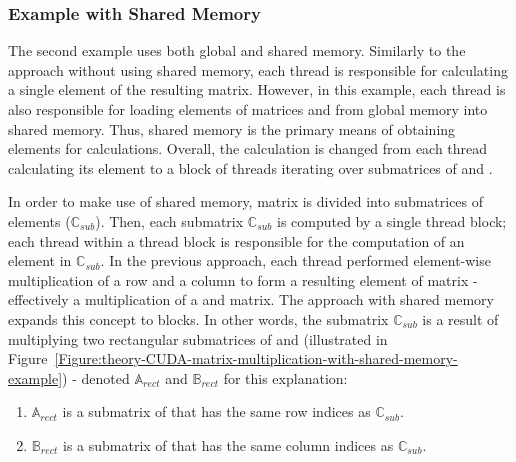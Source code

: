 \subsubsection{Example with Shared Memory}\label{Subsubsection:theory-CUDA-matrix-multiplication-example-with-shared-memory}
The second example uses both global and shared memory. Similarly to the approach without using shared memory, each thread is responsible for calculating a single element of the resulting  matrix. However, in this example, each thread is also responsible for loading elements of matrices  and  from global memory into shared memory. Thus, shared memory is the primary means of obtaining elements for calculations. Overall, the calculation is changed from each thread calculating its element to a block of threads iterating over submatrices of  and .
\par In order to make use of shared memory, matrix  is divided into submatrices of  elements ($ \mathbb{C}_{sub} $). Then, each submatrix $ \mathbb{C}_{sub} $ is computed by a single thread block; each thread within a thread block is responsible for the computation of an element in $ \mathbb{C}_{sub} $. In the previous approach, each thread performed element-wise multiplication of a row and a column to form a resulting element of matrix  - effectively a multiplication of a  and  matrix. The approach with shared memory expands this concept to blocks. In other words, the submatrix $ \mathbb{C}_{sub} $ is a result of multiplying two rectangular submatrices of  and  (illustrated in Figure~\ref{Figure:theory-CUDA-matrix-multiplication-with-shared-memory-example}) - denoted $ \mathbb{A}_{rect} $ and $ \mathbb{B}_{rect} $ for this explanation:

\begin{enumerate}
	\item $ \mathbb{A}_{rect} $ is a  submatrix of  that has the same row indices as $ \mathbb{C}_{sub} $.
	\item $ \mathbb{B}_{rect} $ is a  submatrix of  that has the same column indices as $ \mathbb{C}_{sub} $.
\end{enumerate}

